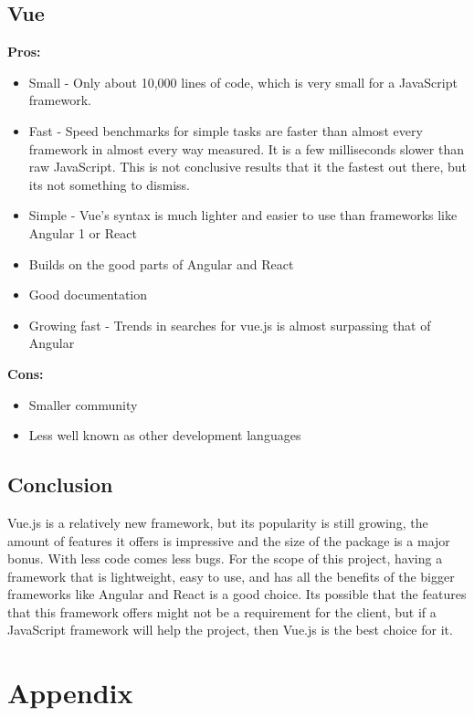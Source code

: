 \documentclass[draftclsnofoot,onecolumn,letterpaper,10pt,compsoc]{IEEEtran}
\begin{document}
  \subsection{Vue}

    \textbf{Pros:}
    \begin{itemize}
      \item Small - Only about 10,000 lines of code, which is very small for a JavaScript framework.
      \item Fast - Speed benchmarks for simple tasks are faster than almost every framework in almost every way measured. It is a few milliseconds slower than raw JavaScript. This is not conclusive results that it the fastest out there, but its not something to dismiss.\cite{SpeedReport}
      \item Simple - Vue's syntax is much lighter and easier to use than frameworks like Angular 1 or React\cite{Vue}
      \item Builds on the good parts of Angular and React
      \item Good documentation
      \item Growing fast - Trends in searches for vue.js is almost surpassing that of Angular\cite{vueVSreactSearches}
    \end{itemize}

    \textbf{Cons:}
    \begin{itemize}
      \item Smaller community
      \item Less well known as other development languages
    \end{itemize}

  \subsection{Conclusion}
    Vue.js is a relatively new framework, but its popularity is still growing, the amount of features it offers is impressive and the size of the package is a major bonus.
    With less code comes less bugs.
    For the scope of this project, having a framework that is lightweight, easy to use, and has all the benefits of the bigger frameworks like Angular and React is a good choice.
    Its possible that the features that this framework offers might not be a requirement for the client, but if a JavaScript framework will help the project, then Vue.js is the best choice for it.

\section{Appendix}
\end{document}
